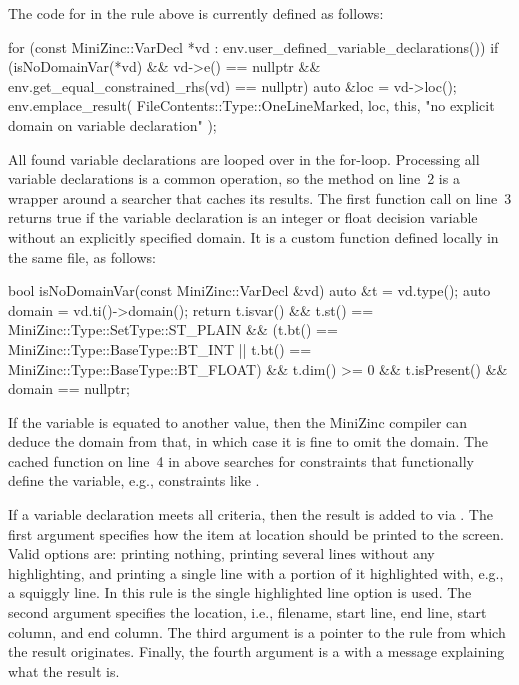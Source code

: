 \documentclass[a4paper,12pt]{article}
\begin{document}
The code for  in the rule above is currently defined as follows:
\begin{cppp}
for (const MiniZinc::VarDecl *vd
     : env.user_defined_variable_declarations()) {
  if (isNoDomainVar(*vd) && vd->e() == nullptr &&
      env.get_equal_constrained_rhs(vd) == nullptr)
  {
    auto &loc = vd->loc();
    env.emplace_result(
      FileContents::Type::OneLineMarked, loc, this,
      "no explicit domain on variable declaration"
    );
  }
}
\end{cppp}
All found variable declarations are looped over in the for-loop. Processing all variable
declarations is a common operation, so the method on line~2 is a wrapper around a searcher
that caches its results. The first function call on line~3 returns true if the variable declaration is
an integer or float decision variable without an explicitly specified domain. It is a custom function
defined locally in the same file, as follows:
\begin{cppp}[style=nonumbers]
bool isNoDomainVar(const MiniZinc::VarDecl &vd) {
  auto &t = vd.type();
  auto domain = vd.ti()->domain();
  return t.isvar()
    && t.st() == MiniZinc::Type::SetType::ST_PLAIN
    && (t.bt() == MiniZinc::Type::BaseType::BT_INT ||
        t.bt() == MiniZinc::Type::BaseType::BT_FLOAT)
    && t.dim() >= 0
    && t.isPresent()
    && domain == nullptr;
}
\end{cppp}

If the variable is equated to another value, then the MiniZinc compiler can deduce
the domain from that, in which case it is fine to omit the domain. The cached function on
line~4 in  above searches for constraints that functionally define the
variable, e.g., constraints like .

\begin{sloppypar}
If a variable declaration meets all criteria, then the result is added to  via
. The first argument specifies how the item at location  should be
printed to the screen. Valid options are: printing nothing, printing several lines without
any highlighting, and printing a single line with a portion of it highlighted with, e.g., a
squiggly line. In this rule is the single highlighted line option is used. The second
argument specifies the location, i.e., filename, start line, end line, start column, and end
column. The third argument is a pointer to the rule from which the result originates.
Finally, the fourth argument is a  with a message explaining what the result is.
\end{sloppypar}
\end{document}
